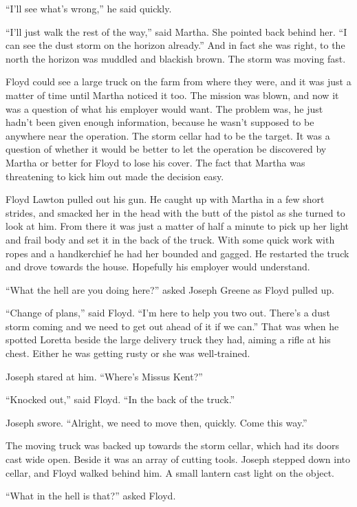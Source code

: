 \documentclass[ebook,12pt]{memoir}
\begin{document}
``I'll see what's wrong,'' he said quickly.

``I'll just walk the rest of the way,'' said Martha. She pointed back
behind her. ``I can see the dust storm on the horizon already.'' And in
fact she was right, to the north the horizon was muddled and blackish
brown. The storm was moving fast.

Floyd could see a large truck on the farm from where they were, and it
was just a matter of time until Martha noticed it too. The mission was
blown, and now it was a question of what his employer would want. The
problem was, he just hadn't been given enough information, because he
wasn't supposed to be anywhere near the operation. The storm cellar had
to be the target. It was a question of whether it would be better to let
the operation be discovered by Martha or better for Floyd to lose his
cover. The fact that Martha was threatening to kick him out made the
decision easy.

Floyd Lawton pulled out his gun. He caught up with Martha in a few short
strides, and smacked her in the head with the butt of the pistol as she
turned to look at him. From there it was just a matter of half a minute
to pick up her light and frail body and set it in the back of the truck.
With some quick work with ropes and a handkerchief he had her bounded
and gagged. He restarted the truck and drove towards the house.
Hopefully his employer would understand.

``What the hell are you doing here?'' asked Joseph Greene as Floyd
pulled up.

``Change of plans,'' said Floyd. ``I'm here to help you two out. There's
a dust storm coming and we need to get out ahead of it if we can.'' That
was when he spotted Loretta beside the large delivery truck they had,
aiming a rifle at his chest. Either he was getting rusty or she was
well‐trained.

Joseph stared at him. ``Where's Missus Kent?''

``Knocked out,'' said Floyd. ``In the back of the truck.''

Joseph swore. ``Alright, we need to move then, quickly. Come this way.''

The moving truck was backed up towards the storm cellar, which had its
doors cast wide open. Beside it was an array of cutting tools. Joseph
stepped down into cellar, and Floyd walked behind him. A small lantern
cast light on the object.

``What in the hell is that?'' asked Floyd.
\end{document}

